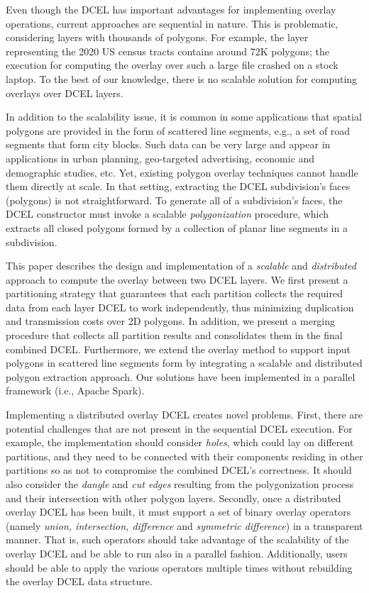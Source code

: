Even though the DCEL has important advantages for implementing overlay operations, current approaches are sequential in nature. This is problematic, considering layers with thousands of polygons. For example, the layer representing the 2020 US census tracts contains around 72K polygons; the execution for computing the overlay over such a large file crashed on a stock laptop. To the best of our knowledge, there is no scalable solution for computing overlays over DCEL layers.


In addition to the scalability issue, it is common in some applications that spatial polygons are provided in the form of scattered line segments, e.g., a set of road segments that form city blocks.
Such data can be very large and appear in applications in urban planning, geo-targeted advertising, economic and demographic studies, etc.
Yet, existing polygon overlay techniques cannot handle them directly at scale.
In that setting, extracting the DCEL subdivision's faces (polygons) is not straightforward. 
To generate all of a subdivision's faces, the DCEL constructor must invoke a scalable \textit{polygonization} procedure, which extracts all closed polygons formed by a collection of planar line segments in a subdivision.

This paper describes the design and implementation of a \textit{scalable} and \textit{distributed} approach to compute the overlay between two DCEL layers. We first present a partitioning strategy that guarantees that each partition collects the required data from each layer DCEL to work independently, thus minimizing duplication and transmission costs over 2D polygons. In addition, we present a merging procedure that collects all partition results and consolidates them in the final combined DCEL.
Furthermore, we extend the overlay method to support input polygons in scattered line segments form by integrating a scalable and distributed polygon extraction approach.
Our solutions have been implemented in a parallel framework (i.e., Apache Spark).

Implementing a distributed overlay DCEL creates novel problems. First, there are potential challenges that are not present in the sequential DCEL execution. 
For example, the implementation should consider \textit{holes}, which could lay on different partitions, and they need to be connected with their components residing in other partitions so as not to compromise the combined DCEL's correctness.
It should also consider the \textit{dangle} and \textit{cut edges} resulting from the polygonization process and their intersection with other polygon layers.
Secondly, once a distributed overlay DCEL has been built, it must support a set of binary overlay operators (namely \textit{union, intersection, difference} and \textit{symmetric difference}) in a transparent manner.  That is, such operators should take advantage of the scalability of the overlay DCEL and be able to run also in a parallel fashion. Additionally, users should be able to apply the various operators multiple times without rebuilding the overlay DCEL data structure.  

